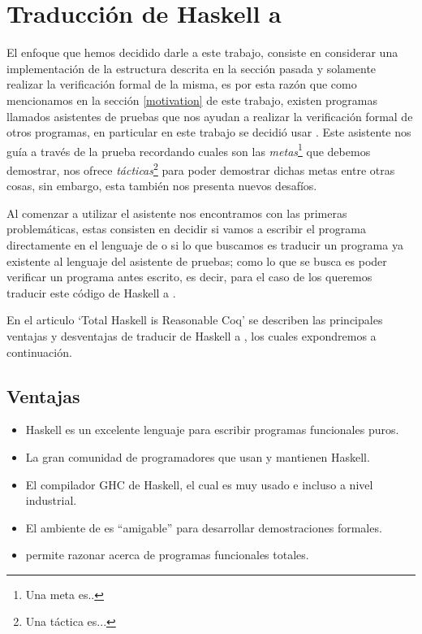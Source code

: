 \section{Traducción de Haskell a {\coq}}
El enfoque que hemos decidido darle a este trabajo, consiste en considerar una implementaci\'on de 
la estructura descrita en la secci\'on pasada y solamente realizar la verificaci\'on formal de la 
misma, es por esta raz\'on que como mencionamos en la secci\'on \ref{motivation} de este trabajo, 
existen programas llamados asistentes de pruebas que nos ayudan a realizar la verificaci\'on formal 
de otros programas, en particular en este trabajo se decidió usar {\coq}. Este asistente nos gu\'ia 
a través de la prueba recordando cuales son las \textit{metas}\footnote{Una meta es..} que debemos 
demostrar, nos ofrece \textit{t\'acticas}\footnote{Una táctica es...} para poder demostrar dichas 
metas entre otras cosas, sin embargo, esta tambi\'en nos presenta nuevos desaf\'ios.

Al comenzar a utilizar el asistente nos encontramos con las primeras problem\'aticas, estas 
consisten en decidir si vamos a escribir el programa directamente en el lenguaje de {\coq} o si lo 
que buscamos es traducir un programa ya existente al lenguaje del asistente de pruebas; como lo que 
se busca es poder verificar un programa antes escrito, es decir, para el caso de los {\arns} 
queremos traducir este código de Haskell a {\coq}.

En el articulo `Total Haskell is Reasonable Coq' \cite{thrc} se describen las principales ventajas
y desventajas de traducir de Haskell a {\coq}, los cuales expondremos a continuaci\'on.

\subsection{Ventajas}
\begin{itemize}
    \item Haskell es un excelente lenguaje para escribir programas funcionales puros.
    \item La gran comunidad de programadores que usan y mantienen Haskell.
    \item El compilador GHC de Haskell, el cual es muy usado e incluso a nivel industrial.
    \item El ambiente de {\coq} es ``amigable'' para desarrollar demostraciones formales.
    \item {\coq} permite razonar acerca de programas funcionales totales.
\end{itemize}

